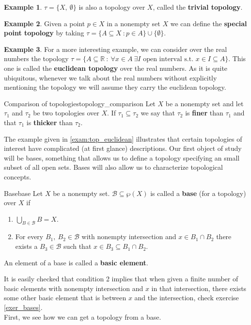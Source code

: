 \documentclass[a4paper]{book}
\theoremstyle{definition}
\theoremstyle{ejemplo}
\newtheorem{example}{Example}[section]
\theoremstyle{demostracion}
\newcommand{\reales}{\mathbb{R}}
\begin{document}
\begin{example}
	$\tau = \{X,\ \emptyset \}$ is also a topology over $X$, called the \textbf{trivial topology}.
\end{example}

\begin{example}
	Given a point $p \in X$ in a nonempty set $X$ we can define the \textbf{special point topology} by taking $\tau = \{A \subseteq X\ : p \in A\} \cup \{ \emptyset \}$.
\end{example}

\begin{example}\label{exam:top_euclidean}
	For a more interesting example, we can consider over the real numbers the topology $\tau = \{A \subseteq \reales\ :\ \forall x \in A\ \exists I \text{ open interval s.t. } x \in I \subseteq A\}$. This one is called the \textbf{euclidean topology} over the real numbers. As it is quite ubiquitous, whenever we talk about the real numbers without explicitly mentioning the topology we will assume they carry the euclidean topology.
\end{example}

\begin{define}{Comparison of topologies}{topology_comparison}
	Let $X$ be a nonempty set and let $\tau_1$ and $\tau_2$ be two topologies over $X$. If $\tau_1 \subseteq \tau_2$ we say that $\tau_2$ is \textbf{finer} than $\tau_1$ and that $\tau_1$ is \textbf{thicker} than $\tau_2$.
\end{define}

The example given in \eqref{exam:top_euclidean} illustrates that certain topologies of interest have complicated (at first glance) descriptions. Our first object of study will be bases, something that allows us to define a topology specifying an small subset of all open sets. Bases will also allow us to characterize topological concepts.

\begin{define}{Base}{base}
	Let $X$ be a nonempty set. $\mathcal{B} \subseteq \wp(X)$ is called a \textbf{base} (for a topology) over $X$ if
	\begin{enumerate}
		\item
		$\bigcup_{B \in \mathcal{B}} B = X$.
		
		\item
		For every $B_1,\ B_2 \in \mathcal{B}$ with nonempty intersection and $x \in B_1 \cap B_2$ there exists a $B_3 \in \mathcal{B}$ such that $x \in B_3 \subseteq B_1 \cap B_2$.
	\end{enumerate}
	An element of a base is called a \textbf{basic element}.
\end{define}
It is easily checked that condition 2 implies that when given a finite number of basic elements with nonempty intersection and $x$ in that intersection, there exists some other basic element that is between $x$ and the intersection, check exercise \eqref{exer_bases}.\\ 
First, we see how we can get a topology from a base.
\end{document}
